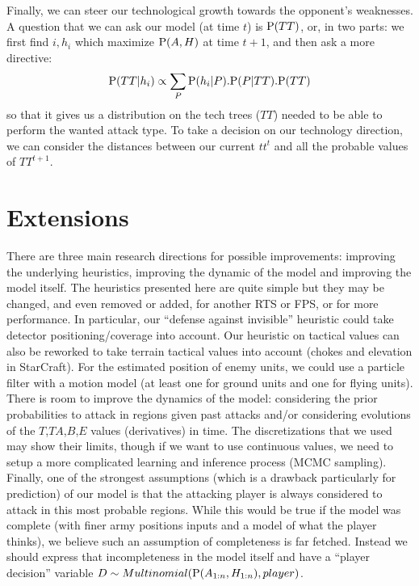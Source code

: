 Finally, we can steer our technological growth towards the opponent's weaknesses. A question that we can ask our model (at time $t$) is $\mathrm{P}(TT)$, or, in two parts: we first find $i,h_i$ which maximize $\mathrm{P}(A,H)$ at time $t+1$, and then ask a more directive:
$$\mathrm{P}(TT|h_i) \propto \sum_{P} \mathrm{P}(h_i|P).\mathrm{P}(P|TT).\mathrm{P}(TT)$$
so that it gives us a distribution on the tech trees ($TT$) needed to be able to perform the wanted attack type. To take a decision on our technology direction, we can consider the distances between our current $tt^t$ and all the probable values of $TT^{t+1}$.

\section{Extensions}
There are three main research directions for possible improvements: improving the underlying heuristics, improving the dynamic of the model and improving the model itself. The heuristics presented here are quite simple but they may be changed, and even removed or added, for another RTS or FPS, or for more performance. In particular, our ``defense against invisible'' heuristic could take detector positioning/coverage into account. Our heuristic on tactical values can also be reworked to take terrain tactical values into account (chokes and elevation in StarCraft). For the estimated position of enemy units, we could use a particle filter \cite{weber2011aiide} with a motion model (at least one for ground units and one for flying units). There is room to improve the dynamics of the model: considering the prior probabilities to attack in regions given past attacks and/or considering evolutions of the $T$,$TA$,$B$,$E$ values (derivatives) in time. The discretizations that we used may show their limits, though if we want to use continuous values, we need to setup a more complicated learning and inference process (MCMC sampling). Finally, one of the strongest assumptions (which is a drawback particularly for prediction) of our model is that the attacking player is always considered to attack in this most probable regions. While this would be true if the model was complete (with finer army positions inputs and a model of what the player thinks), we believe such an assumption of completeness is far fetched. Instead we should express that incompleteness in the model itself and have a ``player decision'' variable $D \sim Multinomial(\mathrm{P}(A_{1:n},H_{1:n}),player)$.

